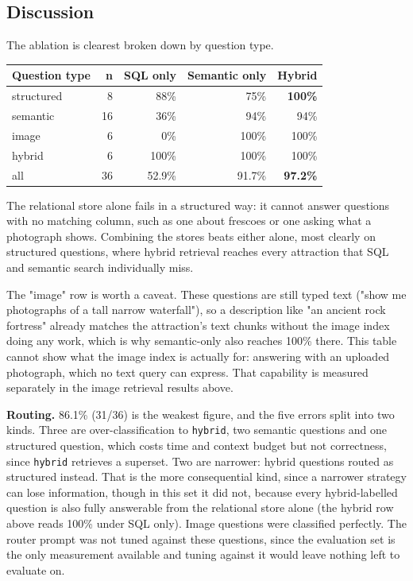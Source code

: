 \documentclass[11pt,a4paper]{article}
\newcommand{\code}[1]{\texttt{\small #1}}
\begin{document}
\subsection{Discussion}

The ablation is clearest broken down by question type.

\begin{center}
\small
\begin{tabular}{@{}lrrrr@{}}
\toprule
\textbf{Question type} & \textbf{n} & \textbf{SQL only} & \textbf{Semantic only} & \textbf{Hybrid} \\
\midrule
structured & 8  & 88\%  & 75\%   & \textbf{100\%} \\
semantic   & 16 & 36\%  & 94\%   & 94\% \\
image      & 6  & 0\%   & 100\%  & 100\% \\
hybrid     & 6  & 100\% & 100\%  & 100\% \\
\midrule
all        & 36 & 52.9\% & 91.7\% & \textbf{97.2\%} \\
\bottomrule
\end{tabular}
\end{center}

The relational store alone fails in a structured way: it cannot answer
questions with no matching column, such as one about frescoes or one asking
what a photograph shows. Combining the stores beats either alone, most
clearly on structured questions, where hybrid retrieval reaches every
attraction that SQL and semantic search individually miss.

The "image" row is worth a caveat. These questions are still typed text
("show me photographs of a tall narrow waterfall"), so a description like
"an ancient rock fortress" already matches the attraction's text chunks
without the image index doing any work, which is why semantic-only also
reaches 100\% there. This table cannot show what the image index is actually
for: answering with an uploaded photograph, which no text query can express.
That capability is measured separately in the image retrieval results above.

\textbf{Routing.} 86.1\% (31/36) is the weakest figure, and the five errors
split into two kinds. Three are over-classification to \code{hybrid}, two
semantic questions and one structured question, which costs time and context
budget but not correctness, since \code{hybrid} retrieves a superset. Two are
narrower: hybrid questions routed as structured instead. That is the more
consequential kind, since a narrower strategy can lose information, though in
this set it did not, because every hybrid-labelled question is also fully
answerable from the relational store alone (the hybrid row above reads 100\%
under SQL only). Image questions were classified perfectly. The router prompt
was not tuned against these questions, since the evaluation set is the only
measurement available and tuning against it would leave nothing left to
evaluate on.
\end{document}
